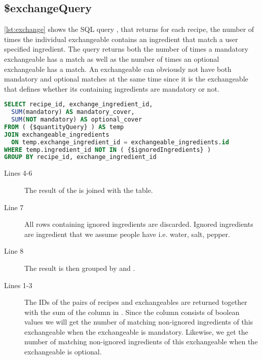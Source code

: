 \subsection*{\$exchangeQuery}
\autoref{lst:exchange} shows the SQL query , that returns for each recipe, the number of times the individual exchangeable contains an ingredient that match a user specified ingredient. The query returns both the number of times a mandatory exchangeable has a match as well as the number of times an optional exchangeable has a match. An exchangeable can obviously not have both mandatory and optional matches at the same time since it is the exchangeable that defines whether its containing ingredients are mandatory or not.
\begin{lstlisting}[language=SQL, float=h, label={lst:exchange}, caption={\$exchangeQuery, returns the number of times the individual exchangeable appear in each recipe.}]
SELECT recipe_id, exchange_ingredient_id,
  SUM(mandatory) AS mandatory_cover,
  SUM(NOT mandatory) AS optional_cover
FROM ( {$quantityQuery} ) AS temp
JOIN exchangeable_ingredients
  ON temp.exchange_ingredient_id = exchangeable_ingredients.id
WHERE temp.ingredient_id NOT IN ( {$ignoredIngredients} )
GROUP BY recipe_id, exchange_ingredient_id
\end{lstlisting}
\begin{description}
\item[Lines 4-6] The result of the  is joined with the  table.
\item[Line 7] All rows containing ignored ingredients are discarded. Ignored ingredients are ingredient that we assume people have i.e. water, salt, pepper.
\item[Line 8] The result is then grouped by  and .
\item[Lines 1-3] The IDs of the pairs of recipes and exchangeables are returned together with the sum of the  column in . Since the  column consists of boolean values we will get the number of matching non-ignored ingredients of this exchangeable when the exchangeable is mandatory. Likewise, we get the number of matching non-ignored ingredients of this exchangeable when the exchangeable is optional.
\end{description}




